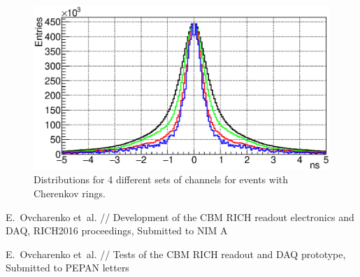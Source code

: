 \documentclass{JACoW-GSI-2015}
\begin{document}
\begin{figure}[tbh]
\includegraphics[width=0.8\linewidth]{../PTE/pictures/25_TimePrecision_evolution_rings_feb2017.eps}
\caption{Distributions for 4 different sets of channels for events with Cherenkov rings.}
\label{fig:TimeResEvolutionRings}
\end{figure}

\begin{thebibliography}{9}

E.~Ovcharenko et~al. //
Development of the CBM RICH readout electronics and DAQ,
RICH2016 proceedings,
Submitted to NIM A

E.~Ovcharenko et~al. //
Tests of the CBM RICH readout and DAQ prototype,
Submitted to PEPAN letters

\end{thebibliography}
\end{document}
